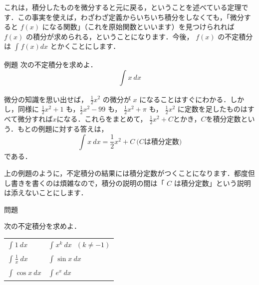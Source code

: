 \documentclass[
  b4paperpaper,
  xelatex,ja=standard]{bxjsbook}
\begin{document}
これは，積分したものを微分すると元に戻る，ということを述べている定理です．この事実を使えば，わざわざ定義からいちいち積分をしなくても，「微分すると
\(f(x)\) になる関数」（これを原始関数といいます）を見つけられれば
\(f(x)\) の積分が求められる，ということになります．今後， \(f(x)\)
の不定積分は \(\displaystyle\int_{}^{}f(x)dx\) とかくことにします．

\begin{Rbox}{例題}
次の不定積分を求めよ． \[\displaystyle\int_{}^{}x\ dx \]

\end{Rbox}


微分の知識を思い出せば， \(\displaystyle\frac{1}{2}x^2\) の微分が \(x\)
になることはすぐにわかる．しかし，同様に
\(\displaystyle\frac{1}{2}x^2+1\) も，\(\displaystyle\frac{1}{2}x^2-99\)
も， \(\displaystyle\frac{1}{2}x^2+\pi\) も，
\(\displaystyle\frac{1}{2}x^2\)
に定数を足したものはすべて微分すれば\(x\)になる．これらをまとめて，
\(\displaystyle\frac{1}{2}x^2+C\)とかき，\(C\)を積分定数という．もとの例題に対する答えは，
\[\displaystyle\int_{}^{}x\ dx =\displaystyle\frac{1}{2}x^2+C~\mbox{($C$は積分定数)}\]
である．

上の例題のように，不定積分の結果には積分定数がつくことになります．都度但し書きを書くのは煩雑なので，積分の説明の間は「
\(C\) は積分定数」という説明は添えないことにします．

\begin{Qbox}{問題}

次の不定積分を求めよ．

\begin{longtable}[]{@{}
  >{\raggedright\arraybackslash}p{}
  >{\raggedright\arraybackslash}p{}@{}}
\toprule\noalign{}
\endhead
\bottomrule\noalign{}
\endlastfoot
\(\displaystyle\int_{}^{}1\ dx\) &
\(\displaystyle\int_{}^{}x^k\ dx\ \ \  ( k\neq -1 )\) \\
\(\displaystyle\int_{}^{}\displaystyle\frac{1}{x}\ dx\) &
\(\displaystyle\int_{}^{} \sin x\ dx\) \\
\(\displaystyle\int_{}^{}\cos x\ dx\) &
\(\displaystyle\int_{}^{} e^x\ dx\) \\
\end{longtable}

\end{Qbox}

\end{document}
